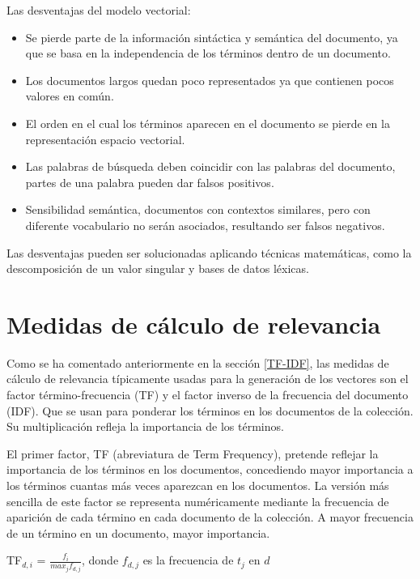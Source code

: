 \documentclass[titlepage]{article}
\begin{document}
Las desventajas del modelo vectorial:

\begin{itemize}
	\item Se pierde parte de la información sintáctica y semántica del documento, ya que se basa en la independencia de los términos dentro de un documento. 
	\item Los documentos largos quedan poco representados ya que contienen pocos valores en común. 
	\item El orden en el cual los términos aparecen en el documento se pierde en la representación espacio vectorial. 
	\item Las palabras de búsqueda deben coincidir con las palabras del documento, partes de una palabra pueden dar falsos positivos. 
	\item Sensibilidad semántica, documentos con contextos similares, pero con diferente vocabulario no serán asociados, resultando ser falsos negativos. 
\end{itemize}

Las desventajas pueden ser solucionadas aplicando técnicas matemáticas, como la descomposición de un valor singular y bases de datos léxicas.

\section{Medidas de cálculo de relevancia}	\label{sec:Medidas de cálculo de relevancia}

Como se ha comentado anteriormente en la sección \ref{TF-IDF}, las medidas de cálculo de relevancia típicamente usadas para la generación de los vectores son el factor término-frecuencia (TF) y el factor inverso de la frecuencia del documento (IDF). Que se usan para ponderar los términos en los documentos de la colección. Su multiplicación refleja la importancia de los términos.

El primer factor, TF (abreviatura de Term Frequency), pretende reflejar la importancia de los términos en los documentos, concediendo mayor importancia a los términos cuantas más veces aparezcan en los documentos. La versión más sencilla de este factor se representa numéricamente mediante la frecuencia de aparición de cada término en cada documento de la colección. A mayor frecuencia de un término en un documento, mayor
importancia.

\begin{center}
	TF$_{d, i}$ = $\frac{f_{i}}{max_{j} f_{d, j}}$, 
	donde $f_{d, j}$ es la frecuencia de $t_{j}$ en $d$
\end{center}
\end{document}
